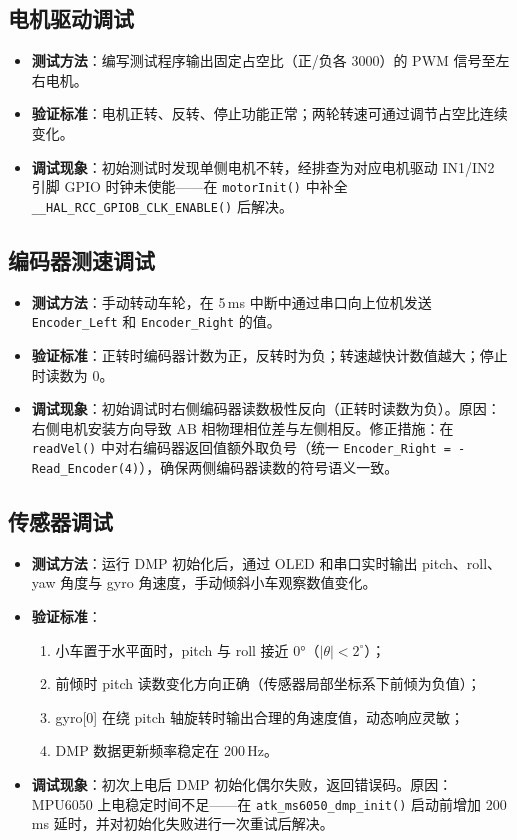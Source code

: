 \documentclass[12pt,a4paper,UTF8]{ctexrep}
\begin{document}
\subsection{电机驱动调试}

\begin{itemize}
  \item \textbf{测试方法}：编写测试程序输出固定占空比（正/负各 3000）的 PWM 信号至左右电机。
  \item \textbf{验证标准}：电机正转、反转、停止功能正常；两轮转速可通过调节占空比连续变化。
  \item \textbf{调试现象}：初始测试时发现单侧电机不转，经排查为对应电机驱动 IN1/IN2 引脚 GPIO 时钟未使能——在 \texttt{motorInit()} 中补全 \texttt{\_\_HAL\_RCC\_GPIOB\_CLK\_ENABLE()} 后解决。
\end{itemize}

\subsection{编码器测速调试}

\begin{itemize}
  \item \textbf{测试方法}：手动转动车轮，在 5\,ms 中断中通过串口向上位机发送 \texttt{Encoder\_Left} 和 \texttt{Encoder\_Right} 的值。
  \item \textbf{验证标准}：正转时编码器计数为正，反转时为负；转速越快计数值越大；停止时读数为 0。
  \item \textbf{调试现象}：初始调试时右侧编码器读数极性反向（正转时读数为负）。原因：右侧电机安装方向导致 AB 相物理相位差与左侧相反。修正措施：在 \texttt{readVel()} 中对右编码器返回值额外取负号（统一 \texttt{Encoder\_Right = -Read\_Encoder(4)}），确保两侧编码器读数的符号语义一致。
\end{itemize}

\subsection{传感器调试}

\begin{itemize}
  \item \textbf{测试方法}：运行 DMP 初始化后，通过 OLED 和串口实时输出 pitch、roll、yaw 角度与 gyro 角速度，手动倾斜小车观察数值变化。
  \item \textbf{验证标准}：
    \begin{enumerate}
      \item 小车置于水平面时，pitch 与 roll 接近 0°（$\left| \theta \right| < 2^{\circ}$）；
      \item 前倾时 pitch 读数变化方向正确（传感器局部坐标系下前倾为负值）；
      \item gyro[0] 在绕 pitch 轴旋转时输出合理的角速度值，动态响应灵敏；
      \item DMP 数据更新频率稳定在 200\,Hz。
    \end{enumerate}
  \item \textbf{调试现象}：初次上电后 DMP 初始化偶尔失败，返回错误码。原因：MPU6050 上电稳定时间不足——在 \texttt{atk\_ms6050\_dmp\_init()} 启动前增加 200\,ms 延时，并对初始化失败进行一次重试后解决。
\end{itemize}
\end{document}
